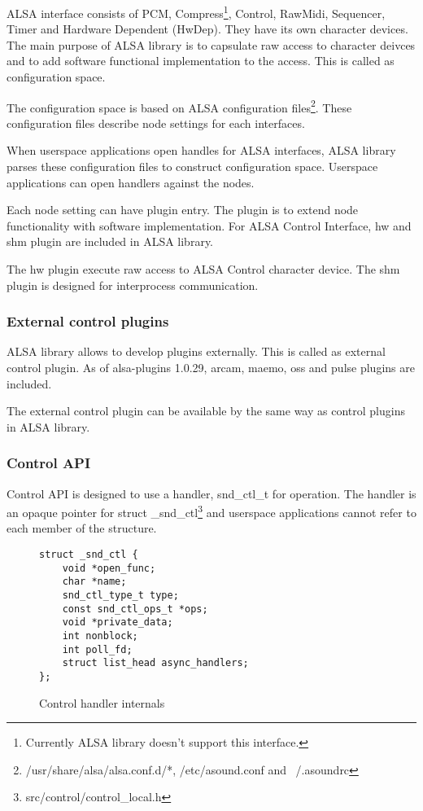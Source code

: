 \documentclass[onecolumn]{article}
\begin{document}
ALSA interface consists of PCM, Compress\footnote{Currently ALSA library doesn't support this interface.}, Control, RawMidi, Sequencer, Timer and Hardware Dependent (HwDep). They have its own character devices. The main purpose of ALSA library is to capsulate raw access to character deivces and to add software functional implementation to the access. This is called as configuration space.

The configuration space is based on ALSA configuration files\footnote{/usr/share/alsa/alsa.conf.d/*, /etc/asound.conf and ~/.asoundrc}. These configuration files describe node settings for each interfaces.

When userspace applications open handles for ALSA interfaces, ALSA library parses these configuration files to construct configuration space. Userspace applications can open handlers against the nodes.

Each node setting can have plugin entry. The plugin is to extend node functionality with software implementation. For ALSA Control Interface, hw and shm plugin are included in ALSA library.

The hw plugin execute raw access to ALSA Control character device. The shm plugin is designed for interprocess communication.


\subsubsection{External control plugins}

ALSA library allows to develop plugins externally. This is called as external control plugin. As of alsa-plugins 1.0.29, arcam, maemo, oss and pulse plugins are included.

The external control plugin can be available by the same way as control plugins in ALSA library.


\subsubsection{Control API}

Control API is designed to use a handler, snd\_ctl\_t for operation. The handler is an opaque pointer for struct \_snd\_ctl\footnote{src/control/control\_local.h} and userspace applications cannot refer to each member of the structure.

\begin{figure}[htbp]
\small
\begin{verbatim}
struct _snd_ctl {
    void *open_func;
    char *name;
    snd_ctl_type_t type;
    const snd_ctl_ops_t *ops;
    void *private_data;
    int nonblock;
    int poll_fd;
    struct list_head async_handlers;
};
\end{verbatim}
\caption{{Control handler internals}}
\label{control-handler-internals}
\end{figure}
\end{document}
